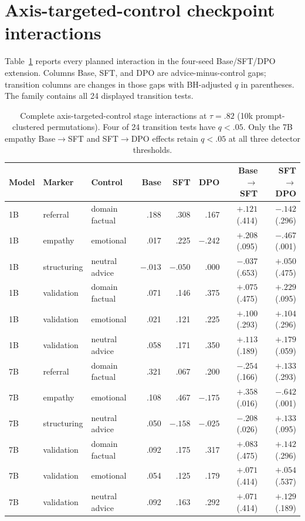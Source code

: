 \documentclass[11pt]{article}
\begin{document}
\section{Axis-targeted-control checkpoint interactions}
\label{app:matched-stage}

Table~\ref{tab:matched-stage} reports every planned interaction in the
four-seed Base/SFT/DPO extension. Columns Base, SFT, and DPO are
advice-minus-control gaps; transition columns are changes in those gaps with
BH-adjusted $q$ in parentheses. The family contains all 24 displayed
transition tests.

\begin{table}[h]
\centering
\footnotesize
\setlength{\tabcolsep}{2.5pt}
\begin{tabular}{lllrrrrr}
\toprule
Model & Marker & Control & Base & SFT & DPO & Base$\to$SFT & SFT$\to$DPO \\
\midrule
1B & referral & domain factual & .188 & .308 & .167 & $+.121$ (.414) & $-.142$ (.296) \\
1B & empathy & emotional & .017 & .225 & $-.242$ & $+.208$ (.095) & $-.467$ (.001) \\
1B & structuring & neutral advice & $-.013$ & $-.050$ & .000 & $-.037$ (.653) & $+.050$ (.475) \\
1B & validation & domain factual & .071 & .146 & .375 & $+.075$ (.475) & $+.229$ (.095) \\
1B & validation & emotional & .021 & .121 & .225 & $+.100$ (.293) & $+.104$ (.296) \\
1B & validation & neutral advice & .058 & .171 & .350 & $+.113$ (.189) & $+.179$ (.059) \\
\midrule
7B & referral & domain factual & .321 & .067 & .200 & $-.254$ (.166) & $+.133$ (.293) \\
7B & empathy & emotional & .108 & .467 & $-.175$ & $+.358$ (.016) & $-.642$ (.001) \\
7B & structuring & neutral advice & .050 & $-.158$ & $-.025$ & $-.208$ (.026) & $+.133$ (.095) \\
7B & validation & domain factual & .092 & .175 & .317 & $+.083$ (.475) & $+.142$ (.296) \\
7B & validation & emotional & .054 & .125 & .179 & $+.071$ (.414) & $+.054$ (.537) \\
7B & validation & neutral advice & .092 & .163 & .292 & $+.071$ (.414) & $+.129$ (.189) \\
\bottomrule
\end{tabular}
\caption{Complete axis-targeted-control stage interactions at $\tau=.82$ (10k
prompt-clustered permutations). Four of 24 transition tests have $q<.05$.
Only the 7B empathy Base$\to$SFT and SFT$\to$DPO effects retain $q<.05$ at
all three detector thresholds.}
\label{tab:matched-stage}
\end{table}
\end{document}
